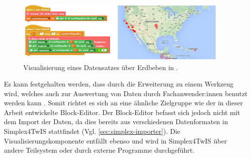 \begin{figure}[!ht]
  \centering
  \includegraphics[width=0.95\textwidth]{assets/datasnap-visualization.png}
  \caption{Visualisierung eines Datensatzes über Erdbeben in \DataSnap{}. \parencite{hellmannDataSnapEnabling2015}}
  \label{fig:datasnap-visualization}
\end{figure}

Es kann festgehalten werden, dass \Snap{} durch die Erweiterung \DataSnap{} zu einem Werkzeug wird, welches auch zur Auswertung von Daten durch Fachanwender:innen benutzt werden kann \parencite{hellmannDataSnapEnabling2015}. Somit richtet es sich an eine ähnliche Zielgruppe wie der in dieser Arbeit entwickelte Block-Editor. Der Block-Editor befasst sich jedoch nicht mit dem Import der Daten, da dies bereits aus verschiedenen Datenformaten in Simplex4TwIS stattfindet (Vgl. \ref{sec:simplex-importer}). Die Visualisierungskomponente entfällt ebenso und wird in Simplex4TwIS über andere Teilsystem oder durch externe Programme durchgeführt.
